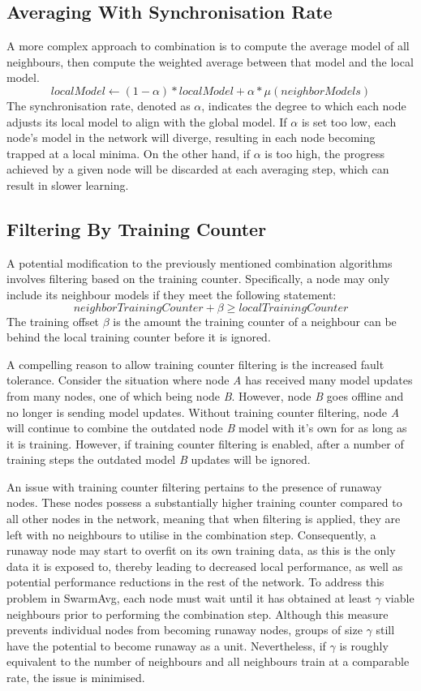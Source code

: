 \subsection{Averaging With Synchronisation Rate}
A more complex approach to combination is to compute the average model of all neighbours, then compute the weighted average between that model and the local model.
\[ localModel \gets (1 - \alpha) * localModel + \alpha * \mu(neighborModels) \]
The synchronisation rate, denoted as $\alpha$, indicates the degree to which each node adjusts its local model to align with the global model. If $\alpha$ is set too low, each node's model in the network will diverge, resulting in each node becoming trapped at a local minima. On the other hand, if $\alpha$ is too high, the progress achieved by a given node will be discarded at each averaging step, which can result in slower learning.

\subsection{Filtering By Training Counter}
A potential modification to the previously mentioned combination algorithms involves filtering based on the training counter. Specifically, a node may only include its neighbour models if they meet the following statement:
\[neighborTrainingCounter + \beta \ge localTrainingCounter \]
The training offset $\beta$ is the amount the training counter of a neighbour can be behind the local training counter before it is ignored.

A compelling reason to allow training counter filtering is the increased fault tolerance. Consider the situation where node \emph{A} has received many model updates from many nodes, one of which being node \emph{B}. However, node \emph{B} goes offline and no longer is sending model updates. Without training counter filtering, node \emph{A} will continue to combine the outdated node \emph{B} model with it's own for as long as it is training. However, if training counter filtering is enabled, after a number of training steps the outdated model \emph{B} updates will be ignored.

An issue with training counter filtering pertains to the presence of runaway nodes. These nodes possess a substantially higher training counter compared to all other nodes in the network, meaning that when filtering is applied, they are left with no neighbours to utilise in the combination step. Consequently, a runaway node may start to overfit on its own training data, as this is the only data it is exposed to, thereby leading to decreased local performance, as well as potential performance reductions in the rest of the network. To address this problem in SwarmAvg, each node must wait until it has obtained at least $\gamma$ viable neighbours prior to performing the combination step. Although this measure prevents individual nodes from becoming runaway nodes, groups of size $\gamma$ still have the potential to become runaway as a unit. Nevertheless, if $\gamma$ is roughly equivalent to the number of neighbours and all neighbours train at a comparable rate, the issue is minimised.

